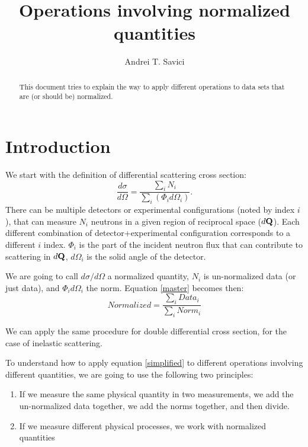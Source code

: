 \documentclass{article}
\begin{document}
\title{Operations involving normalized quantities}
\author{Andrei T. Savici}
\maketitle

\begin{abstract}
This document tries to explain the way to apply different operations to data sets that are (or should be) normalized.
\end{abstract}

\section{Introduction}
We start with the definition of differential scattering cross section:
\begin{equation}\label{master}
\frac{d \sigma}{d \Omega}=\frac{\sum_{i}N_{i} }{\sum_{i}(\Phi_{i}d\Omega_{i})}.
\end{equation}
There can be multiple detectors or experimental configurations (noted by index $i$), that can measure $N_i$ neutrons in a given region of reciprocal space ($d{\bf Q}$). Each different combination of detector+experimental configuration corresponds to a different $i$ index. $\Phi_i$ is the part of the incident neutron flux that can contribute to scattering in $d{\bf Q}$, $d \Omega_i$ is the solid angle of the detector.

We are going to call $d \sigma / d \Omega$ a normalized quantity, $N_i$ is un-normalized data (or just data), and $\Phi_{i}d\Omega_{i}$ the norm. Equation \ref{master} becomes then:
\begin{equation}\label{simplified}
Normalized=\frac{\sum_{i} Data_i}{\sum_{i} Norm_i}
\end{equation}
 
We can apply the same procedure for double differential cross section, for the case of inelastic scattering.

To understand how to apply equation \ref{simplified} to different operations involving different quantities, we are going to use the following two principles:
{\bf
\begin{enumerate}
\item If we measure the same physical quantity in two measurements, we add the un-normalized data together, we add the norms together, and then divide.
\item If we measure different physical processes, we work with normalized quantities
\end{enumerate}
}
\end{document}
